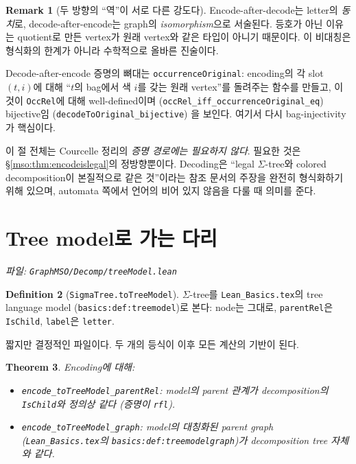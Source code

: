 \documentclass[11pt]{article}
\theoremstyle{definition}
\newtheorem{definition}{Definition}[section]
\newtheorem{remark}[definition]{Remark}
\theoremstyle{plain}
\newtheorem{theorem}[definition]{Theorem}
\newcommand{\lean}[1]{\texttt{#1}}
\newcommand{\leanfile}[1]{\texttt{#1}}
\begin{document}
\begin{remark}[두 방향의 ``역''이 서로 다른 강도다]
\label{mso:rem:twoinverses}
Encode-after-decode는 letter의 \emph{동치}로, decode-after-encode는 graph의
\emph{isomorphism}으로 서술된다. 등호가 아닌 이유는 quotient로 만든 vertex가
원래 vertex와 같은 타입이 아니기 때문이다. 이 비대칭은 형식화의 한계가 아니라
수학적으로 올바른 진술이다.

Decode-after-encode 증명의 뼈대는 \lean{occurrenceOriginal}: encoding의 각
slot $(t,i)$에 대해 ``$t$의 bag에서 색 $i$를 갖는 원래 vertex''를 돌려주는
함수를 만들고, 이것이 \lean{OccRel}에 대해 well-defined이며
(\lean{occRel\_iff\_occurrenceOriginal\_eq}) bijective임
(\lean{decodeToOriginal\_bijective}) 을 보인다. 여기서 다시 bag-injectivity가
핵심이다.
\end{remark}

이 절 전체는 Courcelle 정리의 \emph{증명 경로에는 필요하지 않다}. 필요한 것은
\S\ref{mso:thm:encodeislegal}의 정방향뿐이다. Decoding은 ``legal $\Sigma$-tree와
colored decomposition이 본질적으로 같은 것''이라는 참조 문서의 주장을 완전히
형식화하기 위해 있으며, automata 쪽에서 언어의 비어 있지 않음을 다룰 때
의미를 준다.

\section{Tree model로 가는 다리}
\label{mso:sec:treemodel}

\emph{파일: \leanfile{GraphMSO/Decomp/treeModel.lean}}

\begin{definition}[\lean{SigmaTree.toTreeModel}]
\label{mso:def:totreemodel}
$\Sigma$-tree를 \leanfile{Lean\_Basics.tex}의 tree language model
(\lean{basics:def:treemodel})로 본다: node는 그대로, \lean{parentRel}은
\lean{IsChild}, \lean{label}은 \lean{letter}.
\end{definition}

짧지만 결정적인 파일이다. 두 개의 등식이 이후 모든 계산의 기반이 된다.

\begin{theorem}
\label{mso:thm:modelbridge}
Encoding에 대해:
\begin{itemize}
  \item \lean{encode\_toTreeModel\_parentRel}: model의 parent 관계가
    decomposition의 \lean{IsChild}와 \emph{정의상} 같다 (증명이 \lean{rfl}).
  \item \lean{encode\_toTreeModel\_graph}: model의 대칭화된 parent graph
    (\leanfile{Lean\_Basics.tex}의 \lean{basics:def:treemodelgraph})가
    \emph{decomposition tree 자체}와 같다.
\end{itemize}
\end{theorem}
\end{document}

